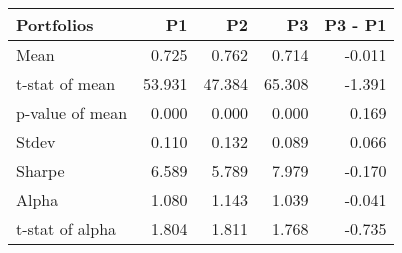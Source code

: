\begin{tabular}{lrrrr}
\toprule
Portfolios & P1 & P2 & P3 & P3 - P1 \\
\midrule
Mean & 0.725 & 0.762 & 0.714 & -0.011 \\
t-stat of mean & 53.931 & 47.384 & 65.308 & -1.391 \\
p-value of mean & 0.000 & 0.000 & 0.000 & 0.169 \\
Stdev & 0.110 & 0.132 & 0.089 & 0.066 \\
Sharpe & 6.589 & 5.789 & 7.979 & -0.170 \\
Alpha & 1.080 & 1.143 & 1.039 & -0.041 \\
t-stat of alpha & 1.804 & 1.811 & 1.768 & -0.735 \\
\bottomrule
\end{tabular}
